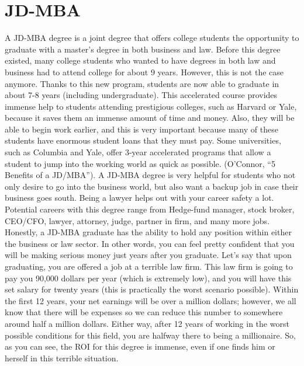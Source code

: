 \chapter{JD-MBA}
\begin{multicols}{2}

A JD-MBA degree is a joint degree that offers college students the opportunity to graduate with a master’s degree in both business and law. Before this degree existed, many college students who wanted to have degrees in both law and business had to attend college for about 9 years. However, this is not the case anymore. Thanks to this new program, students are now able to graduate in about 7-8 years (including undergraduate). This accelerated course provides immense help to students attending prestigious colleges, such as Harvard or Yale, because it saves them an immense amount of time and money. Also, they will be able to begin work earlier, and this is very important because many of these students have enormous student loans that they must pay.  Some universities, such as Columbia and Yale, offer 3-year accelerated programs that allow a student to jump into the working world as quick as possible. (O’Connor, “5 Benefits of a JD/MBA”). A JD-MBA degree is very helpful for students who not only desire to go into the business world, but also want a backup job in case their business goes south. Being a lawyer helps out with your career safety a lot. Potential careers with this degree range from Hedge-fund manager, stock broker, CEO/CFO, lawyer, attorney, judge, partner in firm, and many more jobs. Honestly, a JD-MBA graduate has the ability to hold any position within either the business or law sector. In other words, you can feel pretty confident that you will be making serious money just years after you graduate. Let's say that upon graduating, you are offered a job at a terrible law firm. This law firm is going to pay you 90,000 dollars per year (which is extremely low), and you will have this set salary for twenty years (this is practically the worst scenario possible). Within the first 12 years, your net earnings will be over a million dollars; however, we all know that there will be expenses so we can reduce this number to somewhere around half a million dollars. Either way, after 12 years of working in the worst possible conditions for this field, you are halfway there to being a millionaire. So, as you can see, the ROI for this degree is immense, even if one finds him or herself in this terrible situation.  

\end{multicols}

